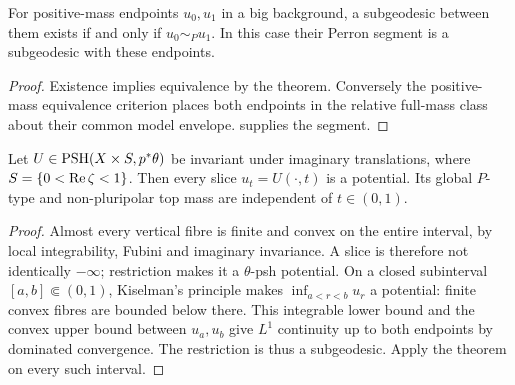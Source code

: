 \begin{corollary}\label{cor:positive-mass-subgeodesic-existence}
For positive-mass endpoints $u_0,u_1$ in a big background, a subgeodesic between them exists if and only if $u_0\sim_P u_1$. In this case their Perron segment is a subgeodesic with these endpoints.
\end{corollary}
\begin{proof}
Existence implies equivalence by the theorem. Conversely the positive-mass equivalence criterion places both endpoints in the relative full-mass class about their common model envelope.  supplies the segment.
\end{proof}

\begin{corollary}\label{cor:invariant-product-slice-mass}
Let $U\in\mathrm{PSH}(X\times S,p^*\theta)$ be invariant under imaginary translations, where $S=\{0<\operatorname{Re}\zeta<1\}$. Then every slice $u_t=U(\cdot,t)$ is a potential. Its global $P$-type and non-pluripolar top mass are independent of $t\in(0,1)$.
\end{corollary}
\begin{proof}
Almost every vertical fibre is finite and convex on the entire interval, by local integrability, Fubini and imaginary invariance. A slice is therefore not identically $-\infty$; restriction makes it a $\theta$-psh potential. On a closed subinterval $[a,b]\Subset(0,1)$, Kiselman's principle makes $\inf_{a<r<b}u_r$ a potential: finite convex fibres are bounded below there. This integrable lower bound and the convex upper bound between $u_a,u_b$ give $L^1$ continuity up to both endpoints by dominated convergence. The restriction is thus a subgeodesic. Apply the theorem on every such interval.
\end{proof}
